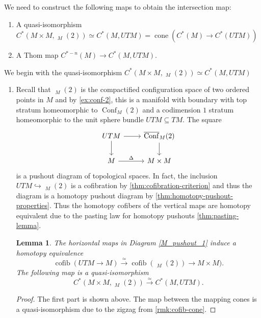 \documentclass{scrartcl}
\theoremstyle{plain}
\newtheorem{lemma}[theorem]{Lemma}
\theoremstyle{definition}
\renewcommand{\subset}{\subseteq}
\DeclareMathOperator{\cone}{cone}
\DeclareMathOperator{\cofib}{cofib}
\newcommand{\quiso}{\simeq}
\let\xto\xrightarrow
\newcommand{\injto}{\hookrightarrow}
\DeclareMathOperator{\Conf}{Conf}
\DeclareMathOperator{\cConf}{\overline{Conf}}
\begin{document}
We need to construct the following maps to obtain the intersection map:
\begin{enumerate}[(1)]
    \item A quasi-isomorphism $C^*(M\times M, \cConf_M(2))\quiso C^*(M, UTM) = \cone(C^*(M)\to C^*(UTM))$
    \item A Thom map $C^{*-n}(M)\to C^*(M, UTM)$.
\end{enumerate}
We begin with the quasi-isomorphism $C^*(M\times M, \cConf_M(2))\quiso C^*(M, UTM)$
\begin{enumerate}[(1)]
    \item
Recall that $\cConf_M(2)$ is the compactified configuration space of two ordered points in $M$ and by \cref{ex:conf-2}, this is a manifold with boundary with top stratum homeomorphic to $\Conf_M(2)$ and a codimension $1$ stratum homeomorphic to the unit sphere bundle $UTM\subset TM$. The square
\begin{equation}\label{M_pushout_1}
\begin{tikzcd}
    UTM \dar\rar & \cConf_M(2)\dar \\
    M \rar["\Delta"] & M\times M
\end{tikzcd}
\end{equation}
is a pushout diagram of topological spaces. In fact, the inclusion $UTM \injto \cConf_M(2)$ is a cofibration by \cref{thm:cofibration-criterion} and thus the diagram is a homotopy pushout diagram by \cref{thm:homotopy-pushout-properties}. Thus the homotopy cofibers of the vertical maps are homotopy equivalent due to the pasting law for homotopy pushouts \cref{thm:pasting-lemma}. 


\begin{lemma}\label{lem:M-cofib-hteq}
    The horizontal maps in Diagram \ref{M_pushout_1} induce a homotopy equivalence $$\cofib(UTM\to M) \xto{\quiso} \cofib(\cConf_M(2))\to M\times M).$$
    The following map is a quasi-isomorphism $$C^*(M\times M, \cConf_M(2))\xto{\quiso} C^*(M, UTM).$$
\end{lemma}
\begin{proof}
    The first part is shown above. The map between the mapping cones is a quasi-isomorphism due to the zigzag from \cref{rmk:cofib-cone}. 
\end{proof}


\end{enumerate}
\end{document}
